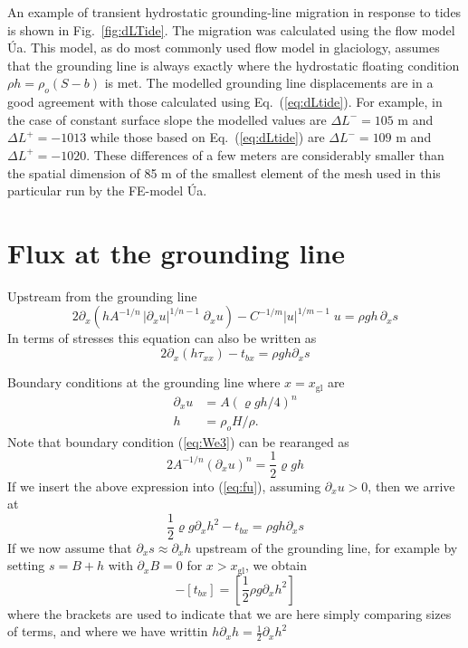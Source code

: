 \documentclass[10pt,a4paper]{book}
\newcommand{\p}{\partial}
\newcommand{\txx}{\tau_{xx}}
\newcommand{\xgl}{x_{\mathrm{gl}}}
\begin{document}
An example of transient hydrostatic grounding-line migration in
response to tides is shown in Fig.~\ref{fig:dLTide}. The migration was
calculated using the flow model \'Ua. This model, as do most commonly
used flow model in glaciology, assumes that the grounding line is
always exactly where the hydrostatic floating condition $\rho h=\rho_o
(S-b)$ is met. The modelled grounding line displacements are in a good
agreement with those calculated using Eq.~(\ref{eq:dLtide}). For
example, in the case of constant surface slope the modelled values are
$\Delta L^{-}=105$ m and $\Delta L^{+}=-1013$ while those based on
Eq.~(\ref{eq:dLtide}) are $\Delta L^{-}=109$ m and $\Delta
L^{+}=-1020$. These differences of a few meters are considerably
smaller than the spatial dimension of 85 m of the smallest element of
the mesh used in this particular run by the FE-model \'Ua.





\section{Flux at the grounding line}
\label{sec:FGL}

Upstream from the grounding line
\begin{equation}
  2 \p_x \left (h A^{-1/n} \, | \p_x u|^{1/n-1} \; \p_x u \right ) - C^{-1/m} |u|^{1/m-1} \; u = \rho g h \, \p_x s
\label{eq:fu}
\end{equation}
In terms of stresses this equation can also be written as
\begin{equation}
  2 \p_x (h \txx) -t_{bx}= \rho g h \p_x s
\label{eq:fs}
\end{equation}


Boundary conditions at the grounding line where $x=\xgl$ are
\begin{align}
\p_x u &= A (\varrho g h/4)^n  \label{eq:We3} \\
     h&=\rho_o H /\rho . \label{eq:fc}
\end{align}
Note that boundary condition (\ref{eq:We3}) can be rearanged as
\[
2 A^{-1/n} (\p_x u)^n = \frac{1}{2} \varrho g h
\]
If we insert the above expression into (\ref{eq:fu}), assuming $\p_x u > 0$, then we arrive at
\[
\frac{1}{2}\varrho g \p_x h^2  - t_{bx} = \rho g h \p_x s
\]
If we now assume that $\p_x s \approx \p_x h$ upstream of the
grounding line, for example by setting $s=B+h$ with $\p_x B=0$ for $x>\xgl$, we
obtain
\begin{equation}
[\frac{1}{2} \varrho g \p_x h^2] - [t_{bx}] = [\frac{1}{2} \rho g \p_x h^2]
\label{eq:ghp}
\end{equation}
where the brackets are used to indicate that we are here simply
comparing sizes of terms, and where we have writtin $ h \p_x h = \frac{1}{2} \p_x h^2 $
\end{document}
